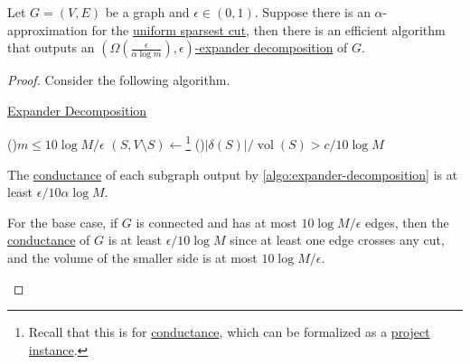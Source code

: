 \begin{theorem}\label{thm:expander-decomposition}
	Let \(G=(V, E)\) be a graph and \(\epsilon \in (0, 1)\). Suppose there is an \(\alpha \)-approximation for the \hyperref[prb:sparsest-cut]{uniform sparsest cut}, then there is an efficient algorithm that outputs an \hyperref[def:expander-decomposition]{\((\Omega (\frac{\epsilon }{\alpha \log m}), \epsilon )\)-expander decomposition} of \(G\).
\end{theorem}
\begin{proof}
	Consider the following algorithm.

	\begin{algorithm}[H]\label{algo:expander-decomposition}
		\DontPrintSemicolon{}
		\caption{\hyperref[def:expander-decomposition]{Expander Decomposition}}

		\BlankLine

		\If(){\(m \leq 10 \log M / \epsilon \)}{
			\;
		}
		\;
		\((S, V\setminus S) \gets\)\footnote{Recall that this is for \hyperref[def:conductance]{conductance}, which can be formalized as a \hyperref[prb:product-instance-of-sparsest-cut]{project instance}.}
		\;
		\uIf(){\(\lvert \delta (S) \rvert / \operatorname{vol}(S) > c / 10 \log M\)}{
			\;
		}
	\end{algorithm}

	\begin{claim}
		The \hyperref[def:conductance]{conductance} of each subgraph output by \autoref{algo:expander-decomposition} is at least \(\epsilon / 10 \alpha \log M\).
	\end{claim}
	\begin{explanation}
		For the base case, if \(G\) is connected and has at most \(10 \log M / \epsilon \) edges, then the \hyperref[def:conductance]{conductance} of \(G\) is at least \(\epsilon / 10 \log M\) since at least one edge crosses any cut, and the volume of the smaller side is at most \(10 \log M / \epsilon \).


\end{explanation}
\end{proof}
